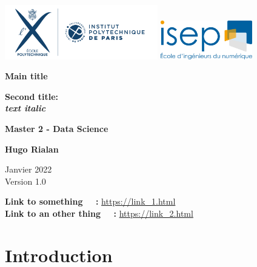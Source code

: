 \documentclass[11pt, oneside]{article}
\begin{document}
\begin{titlepage}
 \includegraphics[width=0.5\textwidth]{images/ipparis_logo.png}
 \hspace{0.7cm}
 \includegraphics[width=0.3\textwidth]{images/logo_isep.png}
 
    \begin{center}
       \vspace{2cm}        
        \Huge{\textbf{Main title}}
        
        
        \vspace{0.5cm}
        \Large{\textbf{Second title: \\ \textit{text italic}}}
       
        \vspace{4cm}
         \Large{\textbf{Master 2 - Data Science}}
          
        
        \vspace{1.5cm}
        \Large{\textbf{Hugo Rialan}}
        
        \vspace{0.5cm}    
        \large{Janvier 2022} \\
        \large{Version 1.0}
 
     \end{center}
        \vfill
         
       \noindent
        \textbf{Link to something \ \ :} \url{https://link_1.html}  \\
        \textbf{Link to an other thing \ \ :} \url{https://link_2.html}
        
        \vspace{1cm}  
        
\end{titlepage}

\vspace*{2cm}
\renewcommand{\contentsname}{Table of contents}
\tableofcontents
\newpage

\section{Introduction}
\end{document}
